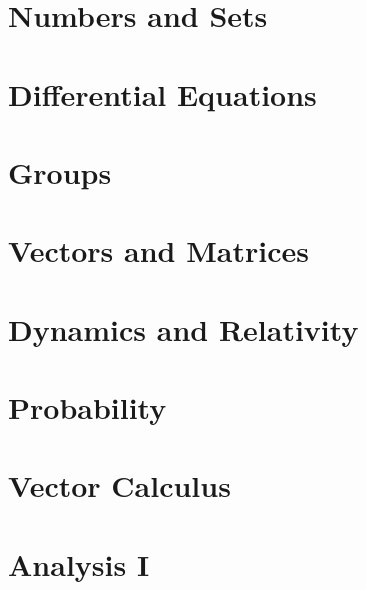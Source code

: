 \newcommand{\yearnumber}{IA}


\chapter{Numbers and Sets}

\chapter{Differential Equations}

\chapter{Groups}

\chapter{Vectors and Matrices}

\chapter{Dynamics and Relativity}

\chapter{Probability}

\chapter{Vector Calculus}

\chapter{Analysis I}



